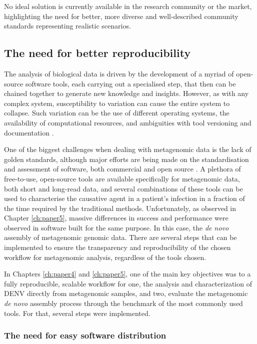 No ideal solution is currently available in the research community or the market, highlighting the need for better, more diverse and well-described community standards representing realistic scenarios. 


\subsection{The need for better reproducibility}

The analysis of biological data is driven by the development of a myriad of open-source software tools, each carrying out a specialised step, that then can be chained together to generate new knowledge and insights. However, as with any complex system, susceptibility to variation can cause the entire system to collapse. Such variation can be the use of different operating systems, the availability of computational resources, and ambiguities with tool versioning and documentation \citep{wratten_reproducible_2021}. 

One of the biggest challenges when dealing with metagenomic data is the lack of golden standards, although major efforts are being made on the standardisation and assessment of software, both commercial and open source \citep{angers-loustau_challenges_2018, gruening_recommendations_2019, sczyrba_critical_2017, couto_critical_2018}. A plethora of free-to-use, open-source tools are available specifically for metagenomic data, both short and long-read data, and several combinations of these tools can be used to characterise the causative agent in a patient's infection in a fraction of the time required by the traditional methods. Unfortunately, as observed in Chapter \ref{ch:paper5}, massive differences in success and performance were observed in software built for the same purpose. In this case, the \textit{de novo} assembly of metagenomic genomic data. There are several steps that can be implemented to ensure the transparency and reproducibility of the chosen workflow for metagenomic analysis, regardless of the tools chosen. 

In Chapters \ref{ch:paper4} and \ref{ch:paper5}, one of the main key objectives was to a fully reproducible, scalable workflow for one, the analysis and characterization of \ac{DENV} directly from metagenomic samples, and two, evaluate the metagenomic \textit{de novo} assembly process through the benchmark of the most commonly used tools. For that, several steps were implemented.

\subsubsection{The need for easy software distribution}

